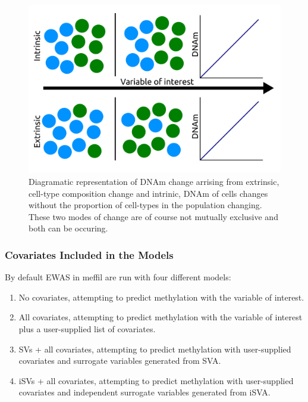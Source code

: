 \documentclass[]{book}
\providecommand{\tightlist}{%
  \setlength{\itemsep}{0pt}\setlength{\parskip}{0pt}}
\begin{document}
\begin{figure}

{\centering \includegraphics[width=0.8\linewidth]{figs/IntrinsicVsExtrinsicDNAmChangeGeneral} 

}

\caption{Diagramatic representation of DNAm change arrising from extrinsic, cell-type composition change and intrinic, DNAm of cells changes without the proportion of cell-types in the population changing. These two modes of change are of course not mutually exclusive and both can be occuring.}\label{fig:IntrinsicVsExtrinsicDNAmChangeGeneral}
\end{figure}



\hypertarget{covariates-included-in-the-models}{%
\subsubsection{Covariates Included in the Models}\label{covariates-included-in-the-models}}

By default EWAS in meffil are run with four different models:

\begin{enumerate}
\def\labelenumi{\arabic{enumi}.}
\tightlist
\item
  No covariates, attempting to predict methylation with the variable of interest.
\item
  All covariates, attempting to predict methylation with the variable of interest plus a user-supplied list of covariates.
\item
  SVs + all covariates, attempting to predict methylation with user-supplied covariates and surrogate variables generated from SVA.
\item
  iSVs + all covariates, attempting to predict methylation with user-supplied covariates and independent surrogate variables generated from iSVA.
\end{enumerate}
\end{document}
